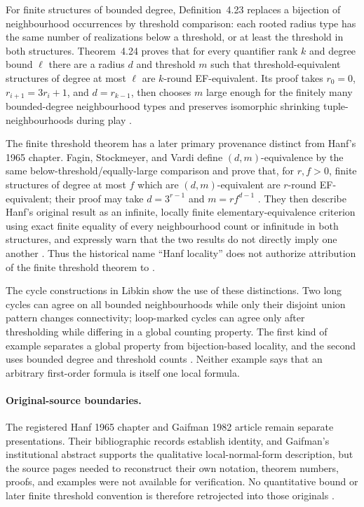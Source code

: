For finite structures of bounded degree, Definition~4.23 replaces a bijection
of neighbourhood occurrences by threshold comparison: each rooted radius type
has the same number of realizations below a threshold, or at least the threshold
in both structures.  Theorem~4.24 proves that for every quantifier rank \(k\)
and degree bound \(\ell\) there are a radius \(d\) and threshold \(m\) such
that threshold-equivalent structures of degree at most \(\ell\) are
\(k\)-round EF-equivalent.  Its proof takes
\(r_0=0\), \(r_{i+1}=3r_i+1\), and \(d=r_{k-1}\), then chooses \(m\) large
enough for the finitely many bounded-degree neighbourhood types and preserves
isomorphic shrinking tuple-neighbourhoods during play
\cite[pp.~61--62]{Libkin2004}.

The finite threshold theorem has a later primary provenance distinct from
Hanf's 1965 chapter.  Fagin, Stockmeyer, and Vardi define
\((d,m)\)-equivalence by the same below-threshold/equally-large comparison and
prove that, for \(r,f>0\), finite structures of degree at most \(f\) which are
\((d,m)\)-equivalent are \(r\)-round EF-equivalent; their proof may take
\(d=3^{r-1}\) and \(m=r f^{d-1}\)
\cite[thm.~4.3]{FaginStockmeyerVardi1995}.  They then describe Hanf's original
result as an infinite, locally finite elementary-equivalence criterion using
exact finite equality of every neighbourhood count or infinitude in both
structures, and expressly warn that the two results do not directly imply one
another \cite[lem.~4.5]{FaginStockmeyerVardi1995}.  Thus the historical name
``Hanf locality'' does not authorize attribution of the finite threshold
theorem to \textcite{Hanf1965}.

The cycle constructions in Libkin show the use of these distinctions.  Two
long cycles can agree on all bounded neighbourhoods while only their disjoint
union pattern changes connectivity; loop-marked cycles can agree only after
thresholding while differing in a global counting property.  The first kind of
example separates a global property from bijection-based locality, and the
second uses bounded degree and threshold counts
\cite[pp.~48 and 62--63]{Libkin2004}.  Neither example says that an arbitrary
first-order formula is itself one local formula.

\paragraph{Original-source boundaries.}
The registered Hanf 1965 chapter and Gaifman 1982 article remain separate
presentations.  Their bibliographic records establish identity, and Gaifman's
institutional abstract supports the qualitative local-normal-form description,
but the source pages needed to reconstruct their own notation, theorem numbers,
proofs, and examples were not available for verification.  No quantitative
bound or later finite threshold convention is therefore retrojected into those
originals \cite{Hanf1965,Gaifman1982}.
